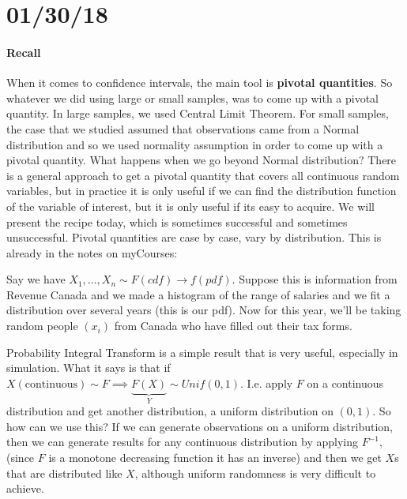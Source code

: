 \documentclass[12 pt]{article}
\begin{document}
  \section{01/30/18}
  \paragraph{Recall}
  When it comes to confidence intervals, the main tool is
  \textbf{pivotal quantities}. So whatever we did using large or small
  samples, was to come up with a pivotal quantity. In large samples,
  we used Central Limit Theorem. For small samples, the case that we
  studied assumed that observations came from a Normal distribution
  and so we used normality assumption in order to come up with a
  pivotal quantity. What happens when we go beyond Normal
  distribution? There is a general approach to get a pivotal quantity
  that covers all continuous random variables, but in practice it is
  only useful if we can find the distribution function of the variable
  of interest, but it is only useful if its easy to acquire. We will
  present the recipe today, which is sometimes successful and
  sometimes unsuccessful. Pivotal quantities are case by case, vary by
  distribution. This is already in the notes on myCourses:

  Say we have $X_1, \ldots, X_n \sim F (cdf) \to f (pdf)$. Suppose
  this is information from Revenue Canada and we made a histogram of
  the range of salaries and we fit a distribution over several years
  (this is our pdf). Now for this year, we'll be taking random people
  $(x_i)$ from Canada who have filled out their tax forms.

  Probability Integral Transform is a simple result that is very
  useful, especially in simulation. What it says is that if $X(\text{continuous}) \sim F
  \implies \underbrace{F(X)}_{Y} \sim Unif(0,1)$. I.e. apply $F$ on a
  continuous distribution and get another distribution, a uniform
  distribution on $(0,1)$. So how can we use this? If we can generate
  observations on a uniform distribution, then we can generate results for
  any continuous distribution by applying $F^{-1}$, (since $F$ is a
  monotone decreasing function it has an inverse) and then we get $X$s
  that are distributed like $X$, although uniform randomness is very
  difficult to achieve.
\end{document}
